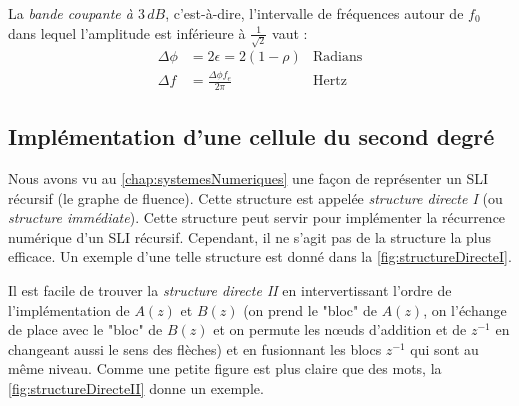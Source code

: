             La \textit{bande coupante à $3\,dB$}, c'est-à-dire, l'intervalle de fréquences autour de $f_0$ dans lequel l'amplitude est inférieure à $\frac{1}{\sqrt{2}}$ vaut :
            \begin{align*}
                \Delta\phi &= 2\epsilon = 2(1 - \rho) & \text{Radians}\\
                \Delta f &= \frac{\Delta\phi f_e}{2\pi} & \text{Hertz}
            \end{align*}

        \subsection{Implémentation d'une cellule du second degré}\label{subsec:implementationCellule}
            Nous avons vu au \autoref{chap:systemesNumeriques} une façon de représenter un SLI récursif (le graphe de fluence). Cette structure est appelée \textit{structure directe I} (ou \textit{structure immédiate}). Cette structure peut servir pour implémenter la récurrence numérique d'un SLI récursif. Cependant, il ne s'agit pas de la structure la plus efficace. Un exemple d'une telle structure est donné dans la \autoref{fig:structureDirecteI}.

            

            Il est facile de trouver la \textit{structure directe II} en intervertissant l'ordre de l'implémentation de $A(z)$ et $B(z)$ (on prend le "bloc" de $A(z)$, on l'échange de place avec le "bloc" de $B(z)$ et on permute les nœuds d'addition et de $z^{-1}$ en changeant aussi le sens des flèches) et en fusionnant les blocs $z^{-1}$ qui sont au même niveau. Comme une petite figure est plus claire que des mots, la \autoref{fig:structureDirecteII} donne un exemple.

            

